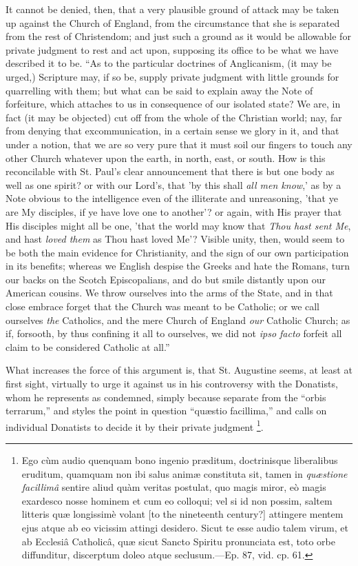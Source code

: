 It cannot be denied, then, that a very plausible ground of attack
may be taken up against the Church of England, from the circumstance
that she is separated from the rest of Christendom; and just such a
ground as it would be allowable for private judgment to rest and act
upon, supposing its office to be what we have described it to be.
``As to the particular doctrines of Anglicanism, (it may be
urged,) Scripture may, if so be, supply private judgment with little
grounds for quarrelling with them; but what can be said to explain
away the Note of forfeiture, which attaches to us in consequence of
our isolated state? We are, in fact (it may be objected) cut off from
the whole of the Christian world; nay, far from denying that
excommunication, in a certain sense we glory in it, and that under a
notion, that we are so very pure that it must soil our fingers to
touch any other Church whatever upon the earth, in north, east, or
south. How is this reconcilable with St. Paul's clear announcement
that there is but one body as well as one spirit? or with our
Lord's, that 'by this shall \emph{all men know},' as by a Note obvious
to the intelligence even of the illiterate and unreasoning, 'that ye
are My disciples, if ye have love one to another'? or again, with His
prayer that His disciples might all be one, 'that the world may know
that \emph{Thou hast sent Me}, and hast \emph{loved them} as Thou hast
loved Me'? Visible unity, then, would seem to be both the main
evidence for Christianity, and the sign of our own participation in
its benefits; whereas we English despise the Greeks and hate the
Romans, turn our backs on the Scotch Episcopalians, and do but smile
distantly upon our American cousins. We throw ourselves into the arms
of the State, and in that close embrace forget that the Church was
meant to be Catholic; or we call ourselves \emph{the} Catholics, and the mere
Church of England \emph{our} Catholic Church; as if, forsooth, by thus
confining it all to ourselves, we did not \emph{ipso facto} forfeit
all claim to be considered Catholic at all.''

What increases the force of this argument is, that St. Augustine
seems, at least at first sight, virtually to urge it against us in his
controversy with the Donatists, whom he represents as condemned,
simply because separate from the ``orbis terrarum,'' and
styles the point in question ``quæstio facillima,'' and calls
on individual Donatists to decide it by their private judgment \footnote{Ego cùm audio
quenquam bono ingenio præditum, doctrinisque liberalibus eruditum,
quamquam non ibi salus animæ constituta sit, tamen in \emph{quæstione
facillimâ} sentire aliud quàm veritas postulat, quo magis miror,
eò magis exardesco nosse hominem et cum eo colloqui; vel si id non
possim, saltem litteris quæ longissimè volant [to the nineteenth
century?] attingere mentem ejus atque ab eo vicissim attingi desidero.
Sicut te esse audio talem virum, et ab Ecclesiâ Catholicâ, quæ
sicut Sancto Spiritu pronunciata est, toto orbe diffunditur,
discerptum doleo atque seclusum.—Ep. 87, vid. cp. 61.}.


